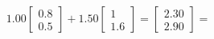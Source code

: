\documentclass[preview]{standalone}
\begin{document}
\begin{align*}
1.00 \begin{bmatrix} 0.8 \\ 0.5 \end{bmatrix} + 1.50 \begin{bmatrix} 1 \\ 1.6 \end{bmatrix} = \begin{bmatrix} 2.30 \\ 2.90 \end{bmatrix} =
\end{align*}
\end{document}
